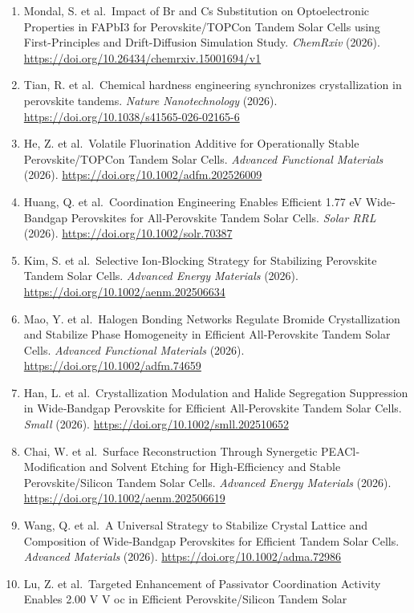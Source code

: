 \documentclass[
  11pt,
]{article}
\begin{document}
\begin{enumerate}
\item
  Mondal, S. et al.~Impact of Br and Cs Substitution on Optoelectronic
  Properties in FAPbI3 for Perovskite/TOPCon Tandem Solar Cells using
  First-Principles and Drift-Diffusion Simulation Study. \emph{ChemRxiv}
  (2026). \url{https://doi.org/10.26434/chemrxiv.15001694/v1}
\item
  Tian, R. et al.~Chemical hardness engineering synchronizes
  crystallization in perovskite tandems. \emph{Nature Nanotechnology}
  (2026). \url{https://doi.org/10.1038/s41565-026-02165-6}
\item
  He, Z. et al.~Volatile Fluorination Additive for Operationally Stable
  Perovskite/TOPCon Tandem Solar Cells. \emph{Advanced Functional
  Materials} (2026). \url{https://doi.org/10.1002/adfm.202526009}
\item
  Huang, Q. et al.~Coordination Engineering Enables Efficient 1.77 eV
  Wide‐Bandgap Perovskites for All‐Perovskite Tandem Solar Cells.
  \emph{Solar RRL} (2026). \url{https://doi.org/10.1002/solr.70387}
\item
  Kim, S. et al.~Selective Ion‐Blocking Strategy for Stabilizing
  Perovskite Tandem Solar Cells. \emph{Advanced Energy Materials}
  (2026). \url{https://doi.org/10.1002/aenm.202506634}
\item
  Mao, Y. et al.~Halogen Bonding Networks Regulate Bromide
  Crystallization and Stabilize Phase Homogeneity in Efficient
  All‐Perovskite Tandem Solar Cells. \emph{Advanced Functional
  Materials} (2026). \url{https://doi.org/10.1002/adfm.74659}
\item
  Han, L. et al.~Crystallization Modulation and Halide Segregation
  Suppression in Wide‐Bandgap Perovskite for Efficient All‐Perovskite
  Tandem Solar Cells. \emph{Small} (2026).
  \url{https://doi.org/10.1002/smll.202510652}
\item
  Chai, W. et al.~Surface Reconstruction Through Synergetic
  PEACl‐Modification and Solvent Etching for High‐Efficiency and Stable
  Perovskite/Silicon Tandem Solar Cells. \emph{Advanced Energy
  Materials} (2026). \url{https://doi.org/10.1002/aenm.202506619}
\item
  Wang, Q. et al.~A Universal Strategy to Stabilize Crystal Lattice and
  Composition of Wide‐Bandgap Perovskites for Efficient Tandem Solar
  Cells. \emph{Advanced Materials} (2026).
  \url{https://doi.org/10.1002/adma.72986}
\item
  Lu, Z. et al.~Targeted Enhancement of Passivator Coordination Activity
  Enables 2.00 V V oc in Efficient Perovskite/Silicon Tandem Solar

\end{enumerate}
\end{document}
